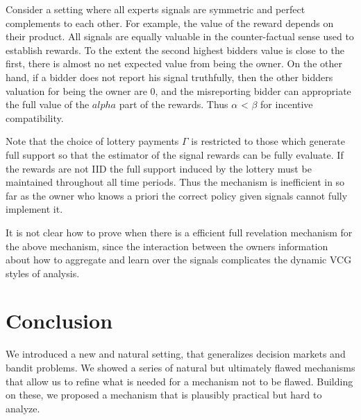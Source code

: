 Consider a setting where all experts signals are symmetric and perfect complements to each other.
For example, the value of the reward depends on their product.
All signals are equally valuable in the counter-factual sense used to establish rewards.
To the extent the second highest bidders value is close to the first, there is almost no net expected value from being the owner.
On the other hand, if a bidder does not report his signal truthfully, then the other bidders valuation for being the owner are 0, and the misreporting bidder can appropriate the full value of the $alpha$ part of the rewards.
Thus $\alpha$ < $\beta$ for incentive compatibility. 

Note that the choice of lottery payments $\Gamma$ is restricted to those which generate full support so that the estimator of the signal rewards can be fully evaluate. 
If the rewards are not IID the full support induced by the lottery must be maintained throughout all time periods. 
Thus the mechanism is inefficient in so far as the owner who knows a priori the correct policy given signals cannot fully implement it. 

It is not clear how to prove when there is a efficient full revelation mechanism for the above mechanism, since the interaction between the owners information about how to aggregate and learn over the signals complicates the dynamic VCG styles of analysis. 


\section{Conclusion}

We introduced a new and natural setting, that generalizes decision markets and bandit problems.
We showed a series of natural but ultimately flawed mechanisms that allow us to refine what is needed for a mechanism not to be flawed.
Building on these, we proposed a mechanism that is plausibly practical but hard to analyze.














